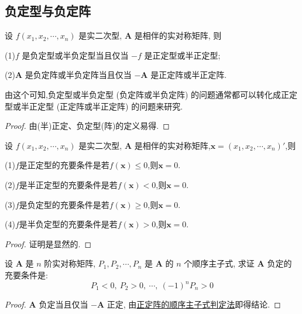 \documentclass[../../main.tex]{subfiles}%
\begin{document}
\subsection{负定型与负定阵}

\begin{theorem}\label{theorem:负定阵或半负定阵的充要条件(与正定差一个负号)}
设 \(f(x_1,x_2,\cdots,x_n)\) 是实二次型, \(\boldsymbol{A}\) 是相伴的实对称矩阵, 则

(1)\(f\) 是负定型或半负定型当且仅当 \(-f\) 是正定型或半正定型;

(2)\(\boldsymbol{A}\) 是负定阵或半负定阵当且仅当 \(-\boldsymbol{A}\) 是正定阵或半正定阵.
\end{theorem}
\begin{remark}
由这个可知,负定型或半负定型 (负定阵或半负定阵) 的问题通常都可以转化成正定型或半正定型 (正定阵或半正定阵) 的问题来研究. 
\end{remark}
\begin{proof}
由(半)正定、负定型(阵)的定义易得.
\end{proof}

\begin{lemma}\label{lemma:(半)正/负定阵/型的等价条件}
设 \(f(x_1,x_2,\cdots,x_n)\) 是实二次型, \(\boldsymbol{A}\) 是相伴的实对称矩阵,$\boldsymbol{x}=(x_1,x_2,\cdots,x_n)'$,则

(1)$f$是正定型的充要条件是若$f(\boldsymbol{x})\leqslant  0$,则$\boldsymbol{x}=0$.

(2)$f$是半正定型的充要条件是若$f(\boldsymbol{x})< 0$,则$\boldsymbol{x}=0$.

(3)$f$是负定型的充要条件是若$f(\boldsymbol{x})\geqslant  0$,则$\boldsymbol{x}=0$.

(4)$f$是半负定型的充要条件是若$f(\boldsymbol{x})> 0$,则$\boldsymbol{x}=0$.
\end{lemma}
\begin{proof}
证明是显然的.
\end{proof}

\begin{proposition}\label{proposition:负定阵的判定准则1}
设 \(\boldsymbol{A}\) 是 \(n\) 阶实对称矩阵, \(P_1,P_2,\cdots,P_n\) 是 \(\boldsymbol{A}\) 的 \(n\) 个顺序主子式, 求证 \(\boldsymbol{A}\) 负定的充要条件是:
\[P_1<0,\ P_2>0,\ \cdots,\ (-1)^nP_n>0\]
\end{proposition}
\begin{proof}
\(\boldsymbol{A}\) 负定当且仅当 \(-\boldsymbol{A}\) 正定, 由\hyperref[theorem:实正定阵的充要条件]{正定阵的顺序主子式判定法}即得结论. 
\end{proof}
\end{document}
